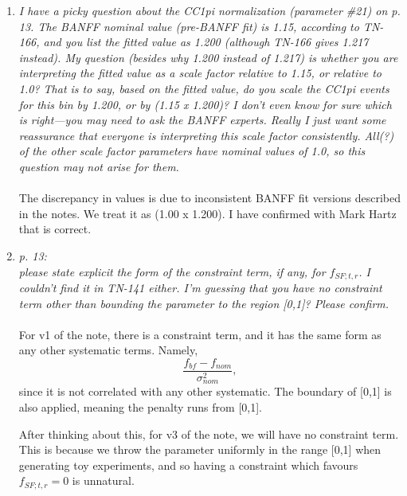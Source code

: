 \begin{enumerate}
  
  \vspace{5 mm}
\item
  {\em
    I have a picky question about the CC1pi normalization (parameter \#21) on p. 13.  The BANFF nominal value (pre-BANFF fit) is 1.15,
    according to TN-166, and you list the fitted value as 1.200 (although TN-166 gives 1.217 instead).  My question
    (besides why 1.200 instead of 1.217) is whether you are interpreting the fitted value as a scale factor relative to 1.15, or
    relative to 1.0?  That is to say, based on the fitted value, do you scale the CC1pi events for this bin by 1.200, or by
    (1.15 x 1.200)?  I don't even know for sure which is right---you may need to ask the BANFF experts.
    Really I just want some reassurance that everyone is interpreting this scale factor consistently.  All(?) of the
    other scale factor parameters have nominal values of 1.0, so this question may not arise for them.
  }\\
  \\
  The discrepancy in values is due to inconsistent BANFF fit versions described in the notes.
  We treat it as (1.00 x 1.200).
  I have confirmed with Mark Hartz that is correct.
  
  \vspace{5 mm}
\item
  {\em
    p. 13:\\
    please state explicit the form of the constraint term, if any, for $f_{SF; t, r}$.  I couldn't find it in TN-141 either.
    I'm guessing that you have no constraint term other than bounding the parameter to the region [0,1]?  Please confirm.
  }\\
  \\
  For v1 of the note, there is a constraint term, and it has the same form as any other systematic terms. Namely,
  \begin{equation}
    \frac{f_{bf} - f_{nom}}{\sigma_{nom}^2},
  \end{equation}
  since it is not correlated with any other systematic.
  The boundary of [0,1] is also applied, meaning the penalty runs from [0,1].

  After thinking about this,
  for v3 of the note, we will have no constraint term.
  This is because we throw the parameter uniformly in the range [0,1]
  when generating toy experiments, and so having a constraint which favours
  $f_{SF; t, r} = 0$ is unnatural.


\end{enumerate}
